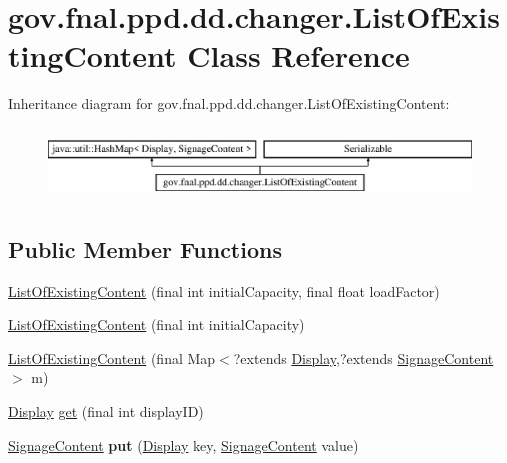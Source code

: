\hypertarget{classgov_1_1fnal_1_1ppd_1_1dd_1_1changer_1_1ListOfExistingContent}{\section{gov.\-fnal.\-ppd.\-dd.\-changer.\-List\-Of\-Existing\-Content Class Reference}
\label{classgov_1_1fnal_1_1ppd_1_1dd_1_1changer_1_1ListOfExistingContent}
}
Inheritance diagram for gov.\-fnal.\-ppd.\-dd.\-changer.\-List\-Of\-Existing\-Content\-:\begin{figure}[H]
\begin{center}
\leavevmode
\includegraphics[height=1.931034cm]{classgov_1_1fnal_1_1ppd_1_1dd_1_1changer_1_1ListOfExistingContent}
\end{center}
\end{figure}
\subsection*{Public Member Functions}
\begin{DoxyCompactItemize}
\item 
\hyperlink{classgov_1_1fnal_1_1ppd_1_1dd_1_1changer_1_1ListOfExistingContent_a4a0caee5f3a804c6a332229a6c3be125}{List\-Of\-Existing\-Content} (final int initial\-Capacity, final float load\-Factor)
\item 
\hyperlink{classgov_1_1fnal_1_1ppd_1_1dd_1_1changer_1_1ListOfExistingContent_ae7e0596f68714aa4d495de13952338db}{List\-Of\-Existing\-Content} (final int initial\-Capacity)
\item 
\hyperlink{classgov_1_1fnal_1_1ppd_1_1dd_1_1changer_1_1ListOfExistingContent_a7fc459c692b7d81691774da95159ab6a}{List\-Of\-Existing\-Content} (final Map$<$?extends \hyperlink{interfacegov_1_1fnal_1_1ppd_1_1dd_1_1signage_1_1Display}{Display},?extends \hyperlink{interfacegov_1_1fnal_1_1ppd_1_1dd_1_1signage_1_1SignageContent}{Signage\-Content} $>$ m)
\item 
\hyperlink{interfacegov_1_1fnal_1_1ppd_1_1dd_1_1signage_1_1Display}{Display} \hyperlink{classgov_1_1fnal_1_1ppd_1_1dd_1_1changer_1_1ListOfExistingContent_ac46b8d64363de8a10423c7d620d98593}{get} (final int display\-I\-D)
\item 
\hypertarget{classgov_1_1fnal_1_1ppd_1_1dd_1_1changer_1_1ListOfExistingContent_a946a8fbe31fde4f9a1ead3a68e0912ae}{\hyperlink{interfacegov_1_1fnal_1_1ppd_1_1dd_1_1signage_1_1SignageContent}{Signage\-Content} {\bfseries put} (\hyperlink{interfacegov_1_1fnal_1_1ppd_1_1dd_1_1signage_1_1Display}{Display} key, \hyperlink{interfacegov_1_1fnal_1_1ppd_1_1dd_1_1signage_1_1SignageContent}{Signage\-Content} value)}\label{classgov_1_1fnal_1_1ppd_1_1dd_1_1changer_1_1ListOfExistingContent_a946a8fbe31fde4f9a1ead3a68e0912ae}

\end{DoxyCompactItemize}


